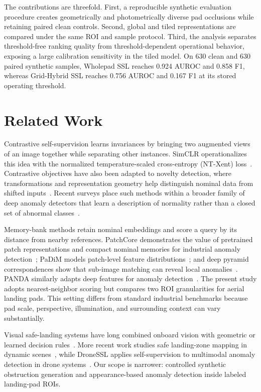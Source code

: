 \documentclass[conference]{IEEEtran}
\begin{document}
The contributions are threefold. First, a reproducible synthetic evaluation procedure creates geometrically and photometrically diverse pad occlusions while retaining paired clean controls. Second, global and tiled representations are compared under the same ROI and sample protocol. Third, the analysis separates threshold-free ranking quality from threshold-dependent operational behavior, exposing a large calibration sensitivity in the tiled model. On 630 clean and 630 paired synthetic samples, Wholepad SSL reaches 0.924 AUROC and 0.858 F1, whereas Grid-Hybrid SSL reaches 0.756 AUROC and 0.167 F1 at its stored operating threshold.

\section{Related Work}
Contrastive self-supervision learns invariances by bringing two augmented views of an image together while separating other instances. SimCLR operationalizes this idea with the normalized temperature-scaled cross-entropy (NT-Xent) loss~\cite{chen2020}. Contrastive objectives have also been adapted to novelty detection, where transformations and representation geometry help distinguish nominal data from shifted inputs~\cite{tack2020}. Recent surveys place such methods within a broader family of deep anomaly detectors that learn a description of normality rather than a closed set of abnormal classes~\cite{ruff2021,hojjati2022}.

Memory-bank methods retain nominal embeddings and score a query by its distance from nearby references. PatchCore demonstrates the value of pretrained patch representations and compact nominal memories for industrial anomaly detection~\cite{roth2022}; PaDiM models patch-level feature distributions~\cite{defard2021}; and deep pyramid correspondences show that sub-image matching can reveal local anomalies~\cite{cohen2020}. PANDA similarly adapts deep features for anomaly detection~\cite{reiss2021}. The present study adopts nearest-neighbor scoring but compares two ROI granularities for aerial landing pads. This setting differs from standard industrial benchmarks because pad scale, perspective, illumination, and surrounding context can vary substantially.

Visual safe-landing systems have long combined onboard vision with geometric or learned decision rules~\cite{yang2013}. More recent work studies safe landing-zone mapping in dynamic scenes~\cite{abdollahzadeh2026}, while DroneSSL applies self-supervision to multimodal anomaly detection in drone systems~\cite{akram2024}. Our scope is narrower: controlled synthetic obstruction generation and appearance-based anomaly detection inside labeled landing-pad ROIs.
\end{document}
